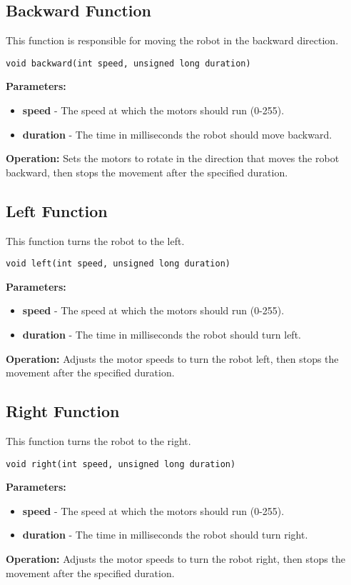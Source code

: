 \documentclass{article} %
\begin{document}
\subsection*{Backward Function}
This function is responsible for moving the robot in the backward direction.
\begin{verbatim}
void backward(int speed, unsigned long duration)
\end{verbatim}
\textbf{Parameters:}
\begin{itemize}
    \item \textbf{speed} - The speed at which the motors should run (0-255).
    \item \textbf{duration} - The time in milliseconds the robot should move backward.
\end{itemize}
\textbf{Operation:} Sets the motors to rotate in the direction that moves the robot backward, then stops the movement after the specified duration.

\subsection*{Left Function}
This function turns the robot to the left.
\begin{verbatim}
void left(int speed, unsigned long duration)
\end{verbatim}
\textbf{Parameters:}
\begin{itemize}
    \item \textbf{speed} - The speed at which the motors should run (0-255).
    \item \textbf{duration} - The time in milliseconds the robot should turn left.
\end{itemize}
\textbf{Operation:} Adjusts the motor speeds to turn the robot left, then stops the movement after the specified duration.

\subsection*{Right Function}
This function turns the robot to the right.
\begin{verbatim}
void right(int speed, unsigned long duration)
\end{verbatim}
\textbf{Parameters:}
\begin{itemize}
    \item \textbf{speed} - The speed at which the motors should run (0-255).
    \item \textbf{duration} - The time in milliseconds the robot should turn right.
\end{itemize}
\textbf{Operation:} Adjusts the motor speeds to turn the robot right, then stops the movement after the specified duration.
\end{document}
